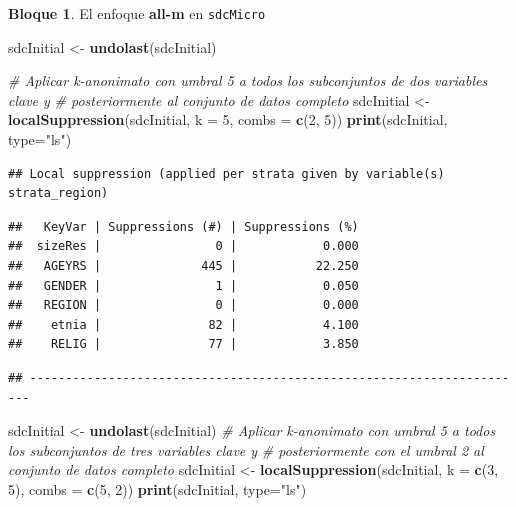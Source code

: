 \documentclass[]{book}
\newenvironment{Shaded}{\begin{snugshade}}{\end{snugshade}}
\newcommand{\CommentTok}[1]{\textcolor[rgb]{0.56,0.35,0.01}{\textit{#1}}}
\newcommand{\DataTypeTok}[1]{\textcolor[rgb]{0.13,0.29,0.53}{#1}}
\newcommand{\DecValTok}[1]{\textcolor[rgb]{0.00,0.00,0.81}{#1}}
\newcommand{\KeywordTok}[1]{\textcolor[rgb]{0.13,0.29,0.53}{\textbf{#1}}}
\newcommand{\NormalTok}[1]{#1}
\newcommand{\StringTok}[1]{\textcolor[rgb]{0.31,0.60,0.02}{#1}}
\theoremstyle{definition}
\theoremstyle{definition}
\newtheorem{example}{Bloque}[chapter]
\theoremstyle{definition}
\theoremstyle{definition}
\theoremstyle{remark}
\begin{document}
\begin{example}
\protect\hypertarget{exm:bloque22jgm}{}{\label{exm:bloque22jgm} }El enfoque \textbf{all-m} en \texttt{sdcMicro}
\end{example}

\begin{Shaded}
\begin{Highlighting}[]
\NormalTok{sdcInitial <-}\StringTok{ }\KeywordTok{undolast}\NormalTok{(sdcInitial)}

\CommentTok{# Aplicar k-anonimato con umbral 5 a todos los subconjuntos de dos variables clave y}
\CommentTok{# posteriormente al conjunto de datos completo}
\NormalTok{sdcInitial <-}\StringTok{ }\KeywordTok{localSuppression}\NormalTok{(sdcInitial, }\DataTypeTok{k =} \DecValTok{5}\NormalTok{, }\DataTypeTok{combs =} \KeywordTok{c}\NormalTok{(}\DecValTok{2}\NormalTok{, }\DecValTok{5}\NormalTok{))}
\KeywordTok{print}\NormalTok{(sdcInitial, }\DataTypeTok{type=}\StringTok{"ls"}\NormalTok{)}
\end{Highlighting}
\end{Shaded}

\begin{verbatim}
## Local suppression (applied per strata given by variable(s) strata_region)
\end{verbatim}

\begin{verbatim}
##   KeyVar | Suppressions (#) | Suppressions (%)
##  sizeRes |                0 |            0.000
##   AGEYRS |              445 |           22.250
##   GENDER |                1 |            0.050
##   REGION |                0 |            0.000
##    etnia |               82 |            4.100
##    RELIG |               77 |            3.850
\end{verbatim}

\begin{verbatim}
## ----------------------------------------------------------------------
\end{verbatim}

\begin{Shaded}
\begin{Highlighting}[]
\NormalTok{sdcInitial <-}\StringTok{ }\KeywordTok{undolast}\NormalTok{(sdcInitial)}
\CommentTok{# Aplicar k-anonimato con umbral 5 a todos los subconjuntos de tres variables clave y}
\CommentTok{# posteriormente con el umbral 2 al conjunto de datos completo}
\NormalTok{sdcInitial <-}\StringTok{ }\KeywordTok{localSuppression}\NormalTok{(sdcInitial, }\DataTypeTok{k =} \KeywordTok{c}\NormalTok{(}\DecValTok{3}\NormalTok{, }\DecValTok{5}\NormalTok{), }\DataTypeTok{combs =} \KeywordTok{c}\NormalTok{(}\DecValTok{5}\NormalTok{, }\DecValTok{2}\NormalTok{))}
\KeywordTok{print}\NormalTok{(sdcInitial, }\DataTypeTok{type=}\StringTok{"ls"}\NormalTok{)}
\end{Highlighting}
\end{Shaded}
\end{document}
